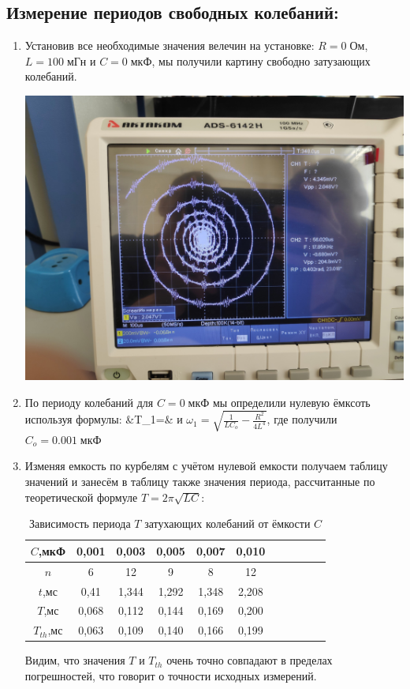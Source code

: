 \documentclass[a4paper,12pt]{article}
\begin{document}
 \subsection{Измерение периодов свободных колебаний:}
 \begin{enumerate}

\item Установив все необходимые значения велечин на установке: $R = 0\;{Ом}$, $L = 100\;{мГн}$ и $C = 0\;{мкФ}$, мы получили картину свободно затузающих колебаний. 
 
 \includegraphics[width=0.6\linewidth]{Spiral.jpg}

 \item По периоду колебаний для $C = 0\;мкФ$ мы определили нулевую ёмксоть используя формулы: &{T_1=}& $ и $  $\omega_1=\sqrt{\frac{1}{LC_o}-\frac{R^2}{4L^4}}$, где получили $C_o = 0.001 \; мкФ$

 \item Изменяя емкость по курбелям с учётом нулевой емкости получаем таблицу значений и занесём в таблицу также значения периода, рассчитанные по теоретической формуле $T=2\pi\sqrt{LC}$: 
 \begin{table}[h]
	\centering
	\begin{tabular}{|c|c|c|c|c|c|c|c|c|c|c|}
		\hline
		$C$,мкФ&0,001&0,003&0,005&0,007&0,010\\ \hline
		$n$&6&12&9&8&12\\ \hline
		$t$,мс&0,41&1,344&1,292&1,348&2,208\\ \hline
		$T$,мс&0,068&0,112&0,144&0,169&0,200\\ \hline
            ${T_{th}}$,мс&0,063&0,109&0,140&0,166&0,199\\ \hline
	\end{tabular}
 \caption{Зависимость периода $T$ затухающих колебаний от ёмкости $C$} \label{per}
\end{table}

Видим, что значения $T$ и $T_{th}$ очень точно совпадают в пределах погрешностей, что говорит о точности исходных измерений.


\end{enumerate}
\end{document}
